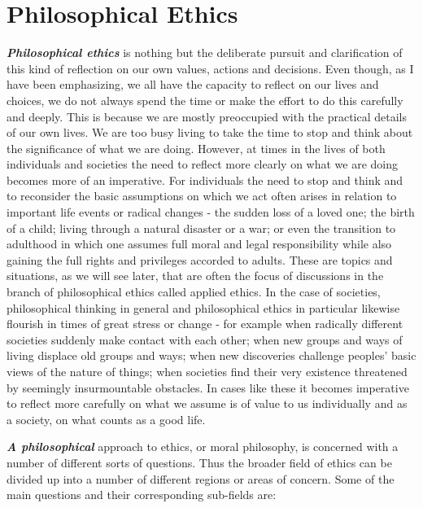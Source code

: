 \documentclass[]{book}
\begin{document}
\hypertarget{philosophical-ethics}{%
\section{Philosophical Ethics}\label{philosophical-ethics}}

\textbf{\emph{Philosophical ethics}} is nothing but the deliberate pursuit and clarification of this kind of reflection on our own values, actions and decisions. Even though, as I have been emphasizing, we all have the capacity to reflect on our lives and choices, we do not always spend the time or make the effort to do this carefully and deeply. This is because we are mostly preoccupied with the practical details of our own lives. We are too busy living to take the time to stop and think about the significance of what we are doing. However, at times in the lives of both individuals and societies the need to reflect more clearly on what we are doing becomes more of an imperative. For individuals the need to stop and think and to reconsider the basic assumptions on which we act often arises in relation to important life events or radical changes - the sudden loss of a loved one; the birth of a child; living through a natural disaster or a war; or even the transition to adulthood in which one assumes full moral and legal responsibility while also gaining the full rights and privileges accorded to adults. These are topics and situations, as we will see later, that are often the focus of discussions in the branch of philosophical ethics called applied ethics. In the case of societies, philosophical thinking in general and philosophical ethics in particular likewise flourish in times of great stress or change - for example when radically different societies suddenly make contact with each other; when new groups and ways of living displace old groups and ways; when new discoveries challenge peoples' basic views of the nature of things; when societies find their very existence threatened by seemingly insurmountable obstacles. In cases like these it becomes imperative to reflect more carefully on what we assume is of value to us individually and as a society, on what counts as a good life.

\textbf{\emph{A philosophical}} approach to ethics, or moral philosophy, is concerned with a number of different sorts of questions. Thus the broader field of ethics can be divided up into a number of different regions or areas of concern. Some of the main questions and their corresponding sub-fields are:
\end{document}
